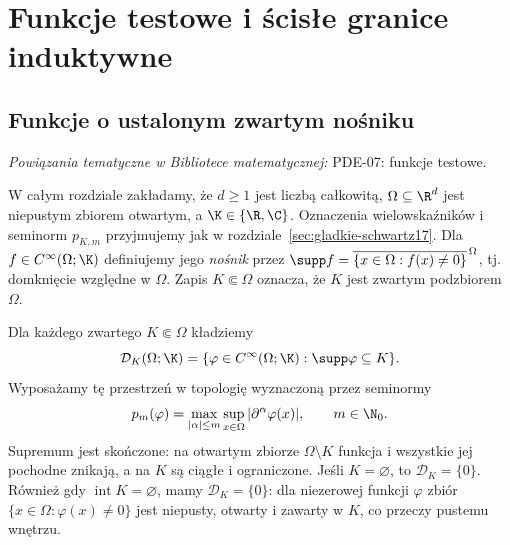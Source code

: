 \setcounter{section}{17}
\section{Funkcje testowe i ścisłe granice induktywne}
\label{sec:funkcje-testowe18}

\providecommand{\atlasref}[2]{#2}


\subsection{Funkcje o ustalonym zwartym nośniku}

\noindent\emph{Powiązania tematyczne w Bibliotece matematycznej:} \atlasref{PDE-07::def:pde7-test}{PDE-07: funkcje testowe}.


W całym rozdziale zakładamy, że $d\ge1$ jest liczbą całkowitą,
$\Omega\subseteq\R^d$ jest niepustym zbiorem otwartym,
a $\K\in\{\R,\C\}$. Oznaczenia wielowskaźników i seminorm
$p_{K,m}$ przyjmujemy jak w rozdziale~\ref{sec:gladkie-schwartz17}.
Dla $f\in C^\infty(\Omega;\K)$ definiujemy jego \emph{nośnik}
przez $\supp f=\overline{\{x\in\Omega:f(x)\ne0\}}^{\,\Omega}$,
tj. domknięcie względne w $\Omega$. Zapis $K\Subset\Omega$
oznacza, że $K$ jest zwartym podzbiorem $\Omega$.

\begin{definicja}
\label{def:DK18}
Dla każdego zwartego $K\Subset\Omega$ kładziemy
\[
 \mathcal D_K(\Omega;\K)=\{\varphi\in C^\infty(\Omega;\K):
 \supp\varphi\subseteq K\}.
\]
Wyposażamy tę przestrzeń w topologię wyznaczoną przez seminormy
\[p_m(\varphi)=\max_{|\alpha|\le m}\sup_{x\in\Omega}
|\partial^\alpha\varphi(x)|,\qquad m\in\N_0.\]
Supremum jest skończone: na otwartym zbiorze $\Omega\setminus K$
funkcja i wszystkie jej pochodne znikają, a na $K$ są ciągłe
i ograniczone. Jeśli $K=\varnothing$, to $\mathcal D_K=\{0\}$.
Również gdy $\operatorname{int}K=\varnothing$, mamy
$\mathcal D_K=\{0\}$: dla niezerowej funkcji $\varphi$
zbiór $\{x\in\Omega:\varphi(x)\ne0\}$ jest niepusty,
otwarty i zawarty w $K$, co przeczy pustemu wnętrzu.
\end{definicja}

